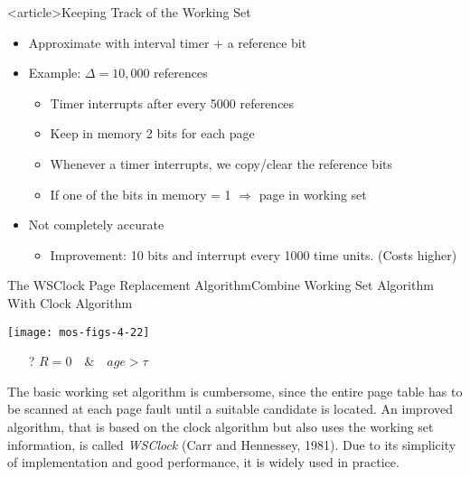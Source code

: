 \begin{frame}<article>{Keeping Track of the Working Set}
  \begin{itemize}
  \item Approximate with interval timer + a reference bit
  \item Example: \(\Delta = 10,000\) references
    \begin{itemize}
    \item Timer interrupts after every 5000 references
    \item Keep in memory 2 bits for each page
    \item Whenever a timer interrupts, we copy/clear the reference bits
    \item If one of the bits in memory = 1 \(\Rightarrow\) page in working set
    \end{itemize}
  \item Not completely accurate
    \begin{itemize}
    \item Improvement: 10 bits and interrupt every 1000 time units. (Costs higher)
    \end{itemize}
  \end{itemize}
\end{frame}


\begin{frame}{The WSClock Page Replacement Algorithm}{Combine Working Set Algorithm With
    Clock Algorithm}
  \begin{minipage}{.5\linewidth}
    \texttt{[image: mos-figs-4-22]}
  \end{minipage}\hfill
  \begin{minipage}{.4\linewidth}
    \begin{itemize}
    \item[?] \(R=0\quad\&\quad age > \tau\)
    \end{itemize}
  \end{minipage}
\end{frame}

The basic working set algorithm is cumbersome, since the entire page table has to be
scanned at each page fault until a suitable candidate is located. An improved algorithm,
that is based on the clock algorithm but also uses the working set information, is called
\emph{WSClock} (Carr and Hennessey, 1981). Due to its simplicity of implementation and
good performance, it is widely used in practice.

